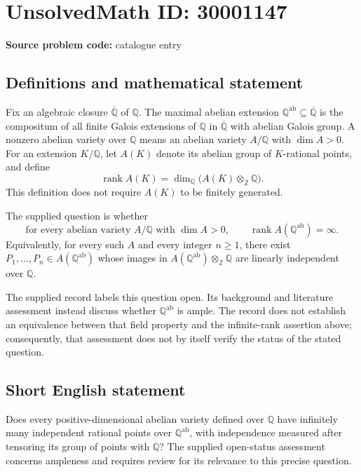 \documentclass[11pt]{article}
\newcommand{\Z}{\mathbb{Z}}
\newcommand{\Q}{\mathbb{Q}}
\begin{document}
\section*{UnsolvedMath ID: 30001147}
\textbf{Source problem code:} catalogue entry
\subsection{Definitions and mathematical statement}
Fix an algebraic closure $\overline{\Q}$ of $\Q$. The maximal abelian extension $\Q^{\mathrm{ab}}\subseteq\overline{\Q}$ is the compositum of all finite Galois extensions of $\Q$ in $\overline{\Q}$ with abelian Galois group. A nonzero abelian variety over $\Q$ means an abelian variety $A/\Q$ with $\dim A>0$. For an extension $K/\Q$, let $A(K)$ denote its abelian group of $K$-rational points, and define
\[
\operatorname{rank} A(K)=\dim_{\Q}\bigl(A(K)\otimes_{\Z}\Q\bigr).
\]
This definition does not require $A(K)$ to be finitely generated.

The supplied question is whether
\[
\text{for every abelian variety }A/\Q\text{ with }\dim A>0,\qquad
\operatorname{rank} A(\Q^{\mathrm{ab}})=\infty.
\]
Equivalently, for every such $A$ and every integer $n\geq 1$, there exist $P_1,\ldots,P_n\in A(\Q^{\mathrm{ab}})$ whose images in $A(\Q^{\mathrm{ab}})\otimes_{\Z}\Q$ are linearly independent over $\Q$.

The supplied record labels this question open. Its background and literature assessment instead discuss whether $\Q^{\mathrm{ab}}$ is ample. The record does not establish an equivalence between that field property and the infinite-rank assertion above; consequently, that assessment does not by itself verify the status of the stated question.
\subsection{Short English statement}
Does every positive-dimensional abelian variety defined over $\Q$ have infinitely many independent rational points over $\Q^{\mathrm{ab}}$, with independence measured after tensoring its group of points with $\Q$? The supplied open-status assessment concerns ampleness and requires review for its relevance to this precise question.
\end{document}
